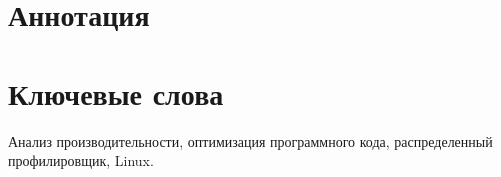 \section*{Аннотация}
\textit{
}

\vspace{2em}

\textit{
}

\section*{Ключевые слова}
Анализ производительности, оптимизация программного кода, распределенный профилировщик, Linux.
